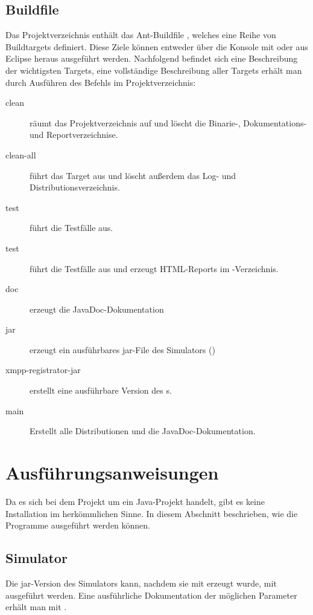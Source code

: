 \subsection{Buildfile}
Das Projektverzeichnis enthält das Ant-Buildfile , welches eine Reihe von Buildtargets definiert. Diese Ziele können entweder über die Konsole mit  oder aus Eclipse heraus ausgeführt werden. Nachfolgend befindet sich eine Beschreibung der wichtigsten Targets, eine vollständige Beschreibung aller Targets erhält man durch Ausführen des Befehls  im Projektverzeichnis:
\begin{description}
	\item[clean] räumt das Projektverzeichnis auf und löscht die Binarie-, Dokumentations- und Reportverzeichnise.
	\item[clean-all] führt das Target  aus und löscht außerdem das Log- und Distributionsverzeichnis.
	\item[test] führt die Testfälle aus.
	\item[test] führt die Testfälle aus und erzeugt HTML-Reports im -Verzeichnis.
	\item[doc] erzeugt die JavaDoc-Dokumentation
	\item[jar] erzeugt ein ausführbares jar-File des Simulators ()
	\item[xmpp-registrator-jar] erstellt eine ausführbare Version des s.
	\item[main] Erstellt alle Distributionen und die JavaDoc-Dokumentation.
\end{description}

\section{Ausführungsanweisungen}\label{sec:appendix_install}
Da es sich bei dem Projekt um ein Java-Projekt handelt, gibt es keine Installation im herkömmlichen Sinne. In diesem Abschnitt beschrieben, wie die Programme ausgeführt werden können.
\subsection{Simulator}
Die jar-Version des Simulators kann, nachdem sie mit  erzeugt wurde, mit  ausgeführt werden. Eine ausführliche Dokumentation der möglichen Parameter erhält man mit .
